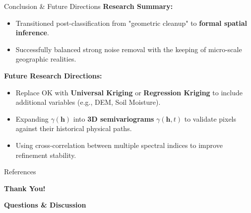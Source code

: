 \documentclass[10pt, aspectratio=169]{beamer}
\begin{document}
\begin{frame}{Conclusion \& Future Directions}
    \textbf{Research Summary:}
    \begin{itemize}
        \item Transitioned post-classification from "geometric cleanup" to \textbf{formal spatial inference}.
        \item Successfully balanced strong noise removal with the keeping of micro-scale geographic realities.
    \end{itemize}

    \vspace{0.3cm}
    \textbf{Future Research Directions:}
    \begin{itemize}
        \item Replace OK with \textbf{Universal Kriging} or \textbf{Regression Kriging} to include additional variables (e.g., DEM, Soil Moisture).
        \item Expanding $\gamma(\mathbf{h})$ into \textbf{3D semivariograms} $\gamma(\mathbf{h}, t)$ to validate pixels against their historical physical paths.
        \item Using cross-correlation between multiple spectral indices to improve refinement stability.
    \end{itemize}
\end{frame}

\begin{frame}[allowframebreaks]{References}
    \printbibliography[heading=none]
\end{frame}

\begin{frame}[plain] %
    \centering
    \vspace{1.5cm}
    {\Huge \textbf{Thank You!}}

    \vspace{0.8cm}
    {\large \textbf{Questions \& Discussion}}

\end{frame}
\end{document}
